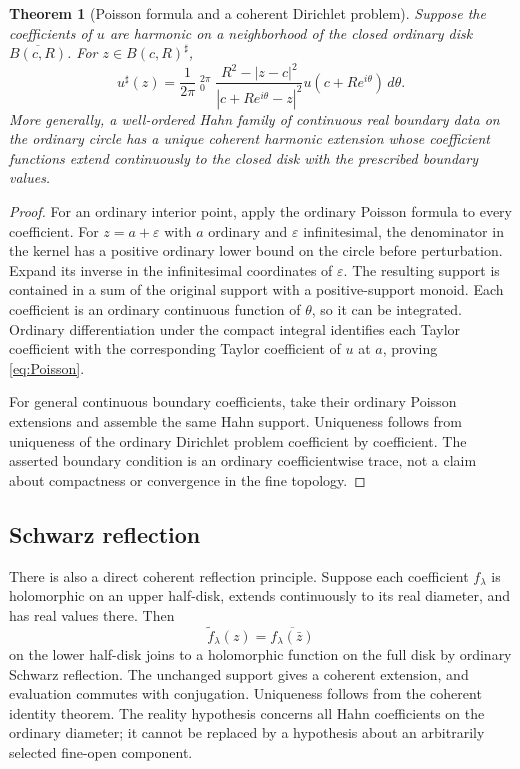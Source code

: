 \documentclass[11pt,letterpaper]{article}
\newtheorem{theorem}{Theorem}[section]
\theoremstyle{definition}
\theoremstyle{remark}
\newcommand{\HInt}{\mathop{\int^{\!H}}\nolimits}
\newcommand{\sh}{^{\sharp}}
\numberwithin{equation}{section}
\begin{document}
\begin{theorem}[Poisson formula and a coherent Dirichlet problem]\label{thm:Poisson}
Suppose the coefficients of $u$ are harmonic on a neighborhood of the closed ordinary disk $\overline{B(c,R)}$. For $z\in B(c,R)\sh$,
\begin{equation}\label{eq:Poisson}
 u\sh(z)=\frac1{2\pi}\HInt_0^{2\pi}
 \frac{R^2-|z-c|^2}{|c+Re^{i\theta}-z|^2}
 u(c+Re^{i\theta})\,d\theta.
\end{equation}
More generally, a well-ordered Hahn family of continuous real boundary data on the ordinary circle has a unique coherent harmonic extension whose coefficient functions extend continuously to the closed disk with the prescribed boundary values.
\end{theorem}
\begin{proof}
For an ordinary interior point, apply the ordinary Poisson formula to every coefficient. For $z=a+\varepsilon$ with $a$ ordinary and $\varepsilon$ infinitesimal, the denominator in the kernel has a positive ordinary lower bound on the circle before perturbation. Expand its inverse in the infinitesimal coordinates of $\varepsilon$. The resulting support is contained in a sum of the original support with a positive-support monoid. Each coefficient is an ordinary continuous function of $\theta$, so it can be integrated. Ordinary differentiation under the compact integral identifies each Taylor coefficient with the corresponding Taylor coefficient of $u$ at $a$, proving \eqref{eq:Poisson}.

For general continuous boundary coefficients, take their ordinary Poisson extensions and assemble the same Hahn support. Uniqueness follows from uniqueness of the ordinary Dirichlet problem coefficient by coefficient. The asserted boundary condition is an ordinary coefficientwise trace, not a claim about compactness or convergence in the fine topology.
\end{proof}

\subsection{Schwarz reflection}
There is also a direct coherent reflection principle. Suppose each coefficient $f_\lambda$ is holomorphic on an upper half-disk, extends continuously to its real diameter, and has real values there. Then
\[
 \widetilde f_\lambda(z)=\overline{f_\lambda(\bar z)}
\]
on the lower half-disk joins to a holomorphic function on the full disk by ordinary Schwarz reflection. The unchanged support gives a coherent extension, and evaluation commutes with conjugation. Uniqueness follows from the coherent identity theorem. The reality hypothesis concerns all Hahn coefficients on the ordinary diameter; it cannot be replaced by a hypothesis about an arbitrarily selected fine-open component.
\end{document}
